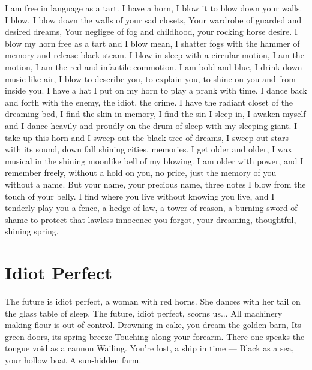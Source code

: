 \documentclass[english,11pt,letterpaper,onecolumn,parskip=full]{scrbook}
\begin{document}
\begin{poem}
\begin{stanza}
I am free in language as a tart. \verseline
I have a horn, I blow it to blow down your walls. \verseline
I blow, I blow down the walls of your sad closets, \verseline
Your wardrobe of guarded and desired dreams, \verseline
Your negligee of fog and childhood, your rocking horse desire. \verseline
I blow my horn free as a tart and I blow mean, \verseline
I shatter fogs with the hammer of memory and release black steam. \verseline
I blow in sleep with a circular motion, I am the motion, I am the red and infantile commotion. \verseline
I am bold and blue, I drink down music like air, I blow to describe you, to explain you, to shine on you and from inside you. \verseline
I have a hat I put on my horn to play a prank with time. \verseline
I dance back and forth with the enemy, the idiot, the crime. \verseline
I have the radiant closet of the dreaming bed, I find the skin in memory, I find the sin I sleep in, I awaken myself and I dance heavily and proudly on the drum of sleep with my sleeping giant. \verseline
I take up this horn and I sweep out the black tree of dreams, I sweep out stars with its sound, down fall shining cities, memories. \verseline
I get older and older, I wax musical in the shining moonlike bell of my blowing.  I am older with power, and I remember freely, without a hold on you, no price, just the memory of you without a name.  But your name, your precious name, three notes I blow from the touch of your belly. \verseline
I find where you live without knowing you live, and I tenderly play you a fence, a hedge of law, a tower of reason, a burning sword of shame to protect that lawless innocence you forgot, your dreaming, thoughtful, shining spring.
\end{stanza}
\end{poem}

\newpage
\section{Idiot Perfect}

\begin{poem}
\begin{stanza}
The future is idiot perfect, a woman with red horns. \verseline
She dances with her tail on the glass table of sleep. \verseline
The future, idiot perfect, scorns us... \verseline
All machinery making flour is out of control. \verseline
Drowning in cake, you dream the golden barn, \verseline
Its green doors, its spring breeze \verseline
Touching along your forearm. \verseline
There one speaks the tongue void as a cannon \verseline
Wailing.  You're lost, a ship in time --- \verseline
Black as a sea, your hollow boat \verseline
A sun-hidden farm.
\end{stanza}
\end{poem}
\end{document}
